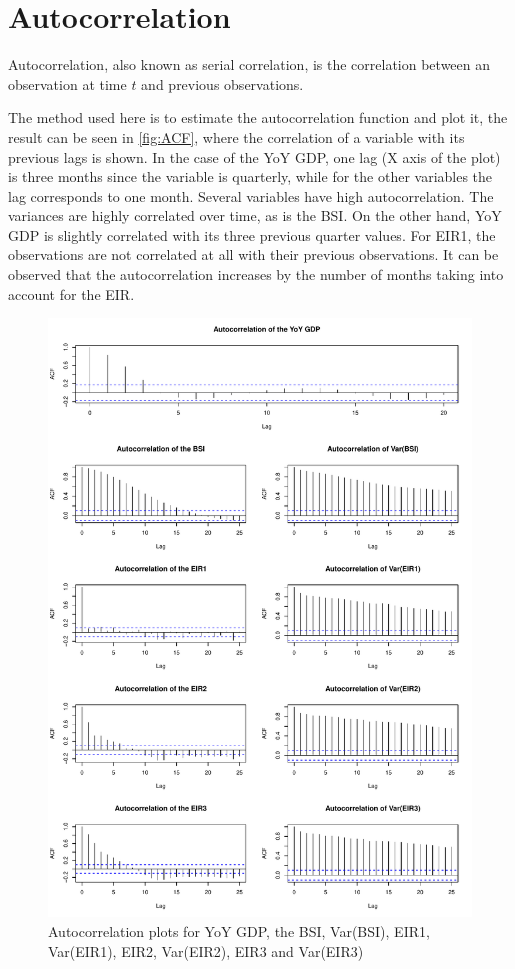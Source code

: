 \documentclass[12pt,a4paper,oneside]{book}
\begin{document}
\section{Autocorrelation}

Autocorrelation, also known as serial correlation, is the correlation between an observation at time $t$ and previous observations.

The method used here is to estimate the autocorrelation function and plot it, the result can be seen in \autoref{fig:ACF}, where the correlation of a variable with its previous lags is shown. 
In the case of the YoY GDP, one lag (X axis of the plot) is three months since the variable is quarterly, while for the other variables the lag corresponds to one month.
Several variables have high autocorrelation. The variances are highly correlated over time, as is the BSI. 
On the other hand, YoY GDP is slightly correlated with its three previous quarter values. 
For EIR1, the observations are not correlated at all with their previous observations. It can be observed that the autocorrelation increases by the number of months taking into account for the EIR.



\begin{figure}[!htbp]
    \centering
    \includegraphics[scale=0.75]{Graphs/ACF.pdf}
    \caption{Autocorrelation plots for YoY GDP, the BSI, Var(BSI), EIR1, Var(EIR1), EIR2, Var(EIR2), EIR3 and Var(EIR3)}
    \label{fig:ACF}
\end{figure}
\end{document}
